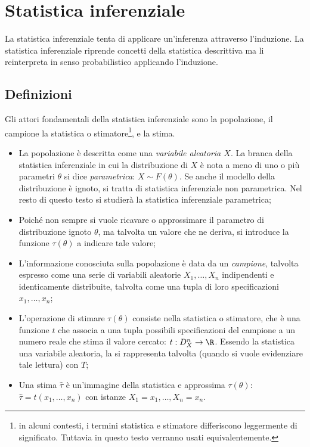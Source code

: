 %
%
%
%


\section{Statistica inferenziale}
La statistica inferenziale tenta di applicare un'inferenza attraverso l'induzione. La statistica inferenziale riprende concetti della statistica descrittiva ma li reinterpreta in senso probabilistico applicando l'induzione.

\subsection{Definizioni}
Gli attori fondamentali della statistica inferenziale sono la popolazione, il campione la statistica o stimatore\footnote{in alcuni contesti, i termini statistica e stimatore differiscono leggermente di significato. Tuttavia in questo testo verranno usati equivalentemente.}, e la stima.

\begin{itemize}
	\item La popolazione è descritta come una \emph{variabile aleatoria $X$}. La branca della statistica inferenziale in cui la distribuzione di $X$ è nota a meno di uno o più parametri $\theta$ si dice \emph{parametrica}: $X\sim F(\theta)$. Se anche il modello della distribuzione è ignoto, si tratta di statistica inferenziale non parametrica. Nel resto di questo testo si studierà la statistica inferenziale parametrica;
	\item Poiché non sempre si vuole ricavare o approssimare il parametro di distribuzione ignoto $\theta$, ma talvolta un valore che ne deriva, si introduce la funzione $\tau(\theta)$ a indicare tale valore;
	\item L'informazione conosciuta sulla popolazione è data da un \emph{campione}, talvolta espresso come una serie di variabili aleatorie $X_1,\dots,X_n$ indipendenti e identicamente distribuite, talvolta come una tupla di loro specificazioni $x_1,\dots,x_n$;
	\item L'operazione di stimare $\tau(\theta)$ consiste nella statistica o stimatore, che è una funzione $t$ che associa a una tupla possibili specificazioni del campione a un numero reale che stima il valore cercato: $t:D_X^n\to\R$. Essendo la statistica una variabile aleatoria, la si rappresenta talvolta (quando si vuole evidenziare tale lettura) con $T$;
	\item Una stima $\hat\tau$ è un'immagine della statistica e approssima $\tau(\theta)$: $\hat\tau = t(x_1,\dots,x_n)$ con istanze $X_1=x_1,\dots,X_n=x_n$.
\end{itemize}

